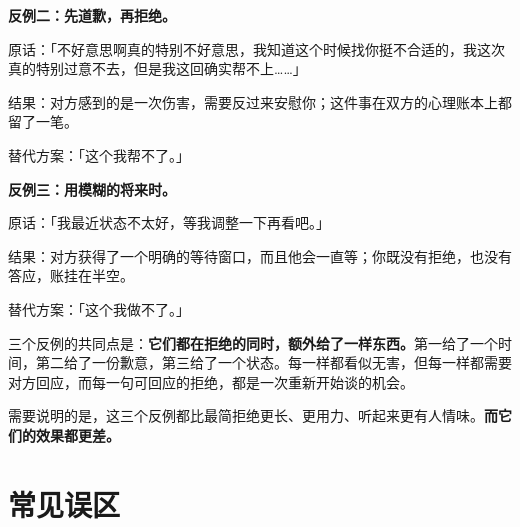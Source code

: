 \begin{mdquote}
\textbf{反例二：先道歉，再拒绝。}\par
\vspace{0.2\baselineskip}
原话：「不好意思啊真的特别不好意思，我知道这个时候找你挺不合适的，我这次真的特别过意不去，但是我这回确实帮不上……」\par
结果：对方感到的是一次伤害，需要反过来安慰你；这件事在双方的心理账本上都留了一笔。\par
替代方案：「这个我帮不了。」
\end{mdquote}

\begin{mdquote}
\textbf{反例三：用模糊的将来时。}\par
\vspace{0.2\baselineskip}
原话：「我最近状态不太好，等我调整一下再看吧。」\par
结果：对方获得了一个明确的等待窗口，而且他会一直等；你既没有拒绝，也没有答应，账挂在半空。\par
替代方案：「这个我做不了。」
\end{mdquote}

三个反例的共同点是：\textbf{它们都在拒绝的同时，额外给了一样东西。}第一给了一个时间，第二给了一份歉意，第三给了一个状态。每一样都看似无害，但每一样都需要对方回应，而每一句可回应的拒绝，都是一次重新开始谈的机会。

需要说明的是，这三个反例都比最简拒绝更长、更用力、听起来更有人情味。\textbf{而它们的效果都更差。}

\section[常见误区]{常见误区}





